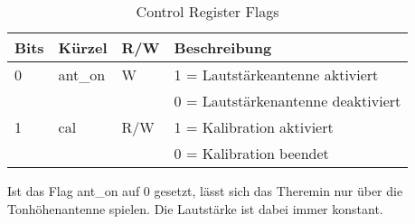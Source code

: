 \begin{table}[H]
	\centering
	\caption{Control Register Flags}
	\label{tab:Register_volume_cntrl}
	\begin{tabular}{l|l|l|l}
		\textbf{Bits} & \textbf{Kürzel} & \textbf{R/W} &	\textbf{Beschreibung}\\
		\hline \hline
		
		0 & ant\_on & W &  1 = Lautstärkeantenne aktiviert \\ 
		&      &   &  0 = Lautstärkenantenne deaktiviert \\ 
		\hline
		1 & cal & R/W &  1 = Kalibration aktiviert \\ 
		&     &     &  0 = Kalibration beendet \\ 
		\hline
	
	\end{tabular}
\end{table}

Ist das Flag ant\_on auf 0 gesetzt, lässt sich das Theremin nur über die Tonhöhenantenne spielen. Die Lautstärke ist dabei immer konstant.



